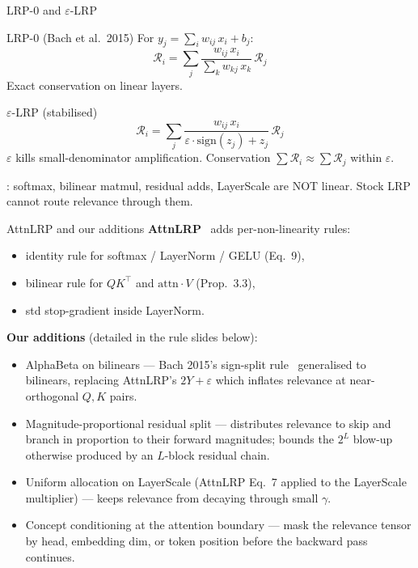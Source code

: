 \documentclass[
  aspectratio=169,
]{beamer}
\newcommand{\eps}{\varepsilon}
\newcommand{\Rel}{\mathcal{R}}
\begin{document}
\begin{frame}{LRP-0 and $\eps$-LRP}
\begin{block}{LRP-0 (Bach et al.\ 2015)}
For $y_j = \sum_i w_{ij}\, x_i + b_j$:
\[
  \Rel_i = \sum_j \frac{w_{ij}\, x_i}{\sum_k w_{kj}\, x_k}\, \Rel_j
\]
Exact conservation on linear layers.
\end{block}
\begin{block}{$\eps$-LRP (stabilised)}
\[
  \Rel_i = \sum_j \frac{w_{ij}\, x_i}{\eps\cdot \mathrm{sign}(z_j) + z_j}\, \Rel_j
\]
$\eps$ kills small-denominator amplification. Conservation $\sum \Rel_i \approx \sum \Rel_j$ within $\eps$.
\end{block}

: softmax, bilinear matmul, residual adds, LayerScale are NOT linear.
Stock LRP cannot route relevance through them.
\end{frame}

\begin{frame}{AttnLRP and our additions}
\textbf{AttnLRP}~\cite{achtibat2024attnlrp} adds per-non-linearity rules:
\begin{itemize}
  \item identity rule for softmax / LayerNorm / GELU (Eq.~9),
  \item bilinear rule for $Q K^\top$ and $\mathrm{attn} \cdot V$ (Prop.~3.3),
  \item std stop-gradient inside LayerNorm.
\end{itemize}

\textbf{Our additions} (detailed in the rule slides below):
\begin{itemize}
  \item \alert{AlphaBeta on bilinears} — Bach 2015's sign-split
        rule~\cite{bach2015lrp} generalised to bilinears, replacing
        AttnLRP's $2Y+\eps$ which inflates relevance at near-orthogonal
        $Q,K$ pairs.
  \item \alert{Magnitude-proportional residual split} — distributes
        relevance to skip and branch in proportion to their forward
        magnitudes; bounds the $2^L$ blow-up otherwise produced by an
        $L$-block residual chain.
  \item \alert{Uniform allocation on LayerScale} (AttnLRP Eq.~7
        applied to the LayerScale multiplier) — keeps relevance from
        decaying through small $\gamma$.
  \item \alert{Concept conditioning at the attention boundary} —
        mask the relevance tensor by head, embedding dim, or token
        position before the backward pass continues.
\end{itemize}
\end{frame}
\end{document}

